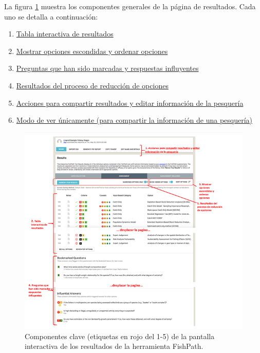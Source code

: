 \documentclass[
  11pt,
]{book}
\providecommand{\tightlist}{%
  \setlength{\itemsep}{0pt}\setlength{\parskip}{0pt}}
\begin{document}
La figura \ref{fig:results-components} muestra los componentes generales de la página de resultados. Cada uno se detalla a continuación:

\begin{enumerate}
\def\labelenumi{\arabic{enumi}.}
\tightlist
\item
  \protect\hyperlink{interactive-results-table}{Tabla interactiva de resultados}
\item
  \protect\hyperlink{Filters-Sorting}{Mostrar opciones escondidas y ordenar opciones}
\item
  \protect\hyperlink{Bookmark-Influential}{Preguntas que han sido marcadas y respuestas influyentes}
\item
  \protect\hyperlink{Results-Narrowing}{Resultados del proceso de reducción de opciones}
\item
  \protect\hyperlink{Results-Actions}{Acciones para compartir resultados y editar información de la pesquería}
\item
  \protect\hyperlink{View-Only}{Modo de ver únicamente (para compartir la información de una pesquería)}
\end{enumerate}

\begin{figure}

{\centering \includegraphics[width=0.95\linewidth]{images/results-components-es} 

}

\caption{Componentes clave (etiquetas en rojo del 1-5) de la pantalla interactiva de los resultados de la herramienta FishPath.}\label{fig:results-components}
\end{figure}
\end{document}
